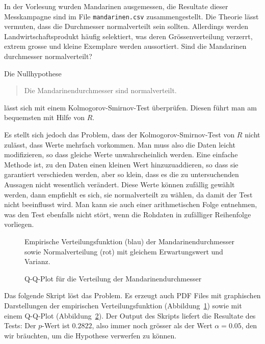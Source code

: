 In der Vorlesung wurden Mandarinen ausgemessen, die Resultate dieser
Messkampagne sind im File \texttt{mandarinen.csv} zusammengestellt.
Die Theorie lässt vermuten, dass die Durchmesser normalverteilt sein
sollten. Allerdings werden Landwirtschaftsprodukt häufig selektiert,
was deren Grössenverteilung verzerrt, extrem grosse und kleine
Exemplare werden aussortiert. Sind die Mandarinen durchmesser normalverteilt?


\begin{loesung}
Die Nullhypothese
\begin{quote}
Die Mandarinendurchmesser sind normalverteilt.
\end{quote}
lässt sich mit einem Kolmogorov-Smirnov-Test überprüfen. Diesen führt
man am bequemsten mit Hilfe von $R$.

Es stellt sich jedoch das Problem,
dass der Kolmogorov-Smirnov-Test von $R$ nicht zulässt, dass Werte
mehrfach vorkommen. Man muss also die Daten leicht modifizieren, so
dass gleiche Werte unwahrscheinlich werden. Eine einfache Methode ist,
zu den Daten einen kleinen Wert hinzuzuaddieren, so dass sie garantiert
verschieden werden, aber so klein, dass es die zu untersuchenden Aussagen
nicht wesentlich verändert. Diese Werte können zufällig gewählt werden,
dann empfiehlt es sich, sie normalverteilt zu wählen, da damit der Test
nicht beeinflusst wird. Man kann sie auch einer arithmetischen Folge
entnehmen, was den Test ebenfalls nicht stört, wenn die Rohdaten in
zufälliger Reihenfolge vorliegen.

\begin{figure}
\begin{center}
\end{center}
\caption{Empirische Verteilungsfunktion (blau) der Mandarinendurchmesser
sowie Normalverteilung (rot) mit gleichem Erwartungswert und Varianz.
\label{80000022:ecdf}}
\end{figure}
\begin{figure}
\begin{center}
\end{center}
\caption{Q-Q-Plot für die Verteilung der Mandarinendurchmesser
\label{80000022:qq}}
\end{figure}

Das folgende Skript löst das Problem. Es erzeugt auch PDF Files mit
graphischen Darstellungen der empirischen Verteilungsfunktion
(Abbildung~\ref{80000022:ecdf}) sowie mit einem Q-Q-Plot
(Abbildung~\ref{80000022:qq}).
{\small
{}
}
Der Output des Skripts liefert die Resultate des Tests:
Der $p$-Wert ist $0.2822$, also immer noch grösser als der Wert
$\alpha = 0.05$, den wir bräuchten, um die Hypothese verwerfen zu können.


\end{loesung}
